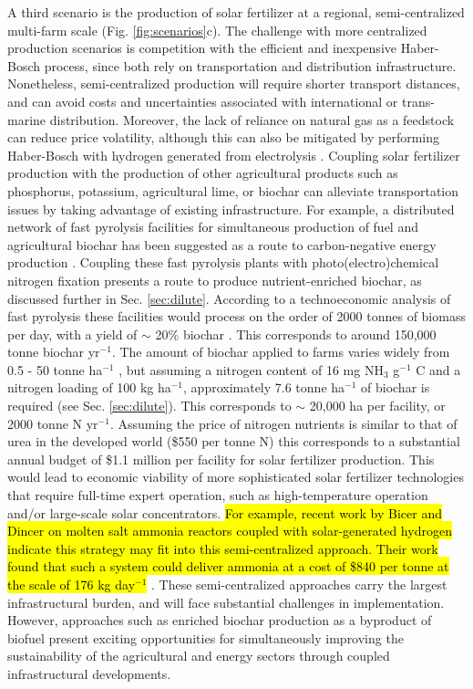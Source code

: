 A third scenario is the production of solar fertilizer at a regional, semi-centralized multi-farm scale (Fig. \ref{fig:scenarios}c). The challenge with more centralized production scenarios is competition with the efficient and inexpensive Haber-Bosch process, since both rely on transportation and distribution infrastructure. Nonetheless, semi-centralized production will require shorter transport distances, and can avoid costs and uncertainties associated with international or trans-marine distribution. Moreover, the lack of reliance on natural gas as a feedstock can reduce price volatility, although this can also be mitigated by performing Haber-Bosch with hydrogen generated from electrolysis \cite{Grundt_1982, Pfromm_2017}. Coupling solar fertilizer production with the production of other agricultural products such as phosphorus, potassium, agricultural lime, or biochar can alleviate transportation issues by taking advantage of existing infrastructure. For example, a distributed network of fast pyrolysis facilities for simultaneous production of fuel and agricultural biochar has been suggested as a route to carbon-negative energy production \cite{Lehmann2007,Lehmann_2007, Glaser2002}. Coupling these fast pyrolysis plants with photo(electro)chemical nitrogen fixation presents a route to produce nutrient-enriched biochar, as discussed further in Sec. \ref{sec:dilute}. According to a technoeconomic analysis of fast pyrolysis these facilities would process on the order of 2000 tonnes of biomass per day, with a yield of $\sim$ 20\% biochar  \cite{Wright_2010}. This corresponds to around 150,000 tonne biochar yr$^{-1}$. The amount of biochar applied to farms varies widely from 0.5 - 50 tonne ha$^{-1}$ \cite{Galinato2011}, but assuming a nitrogen content of 16 mg NH$_3$ g$^{-1}$ C and a nitrogen loading of 100 kg ha$^{-1}$, approximately 7.6 tonne ha$^{-1}$ of biochar is required (see Sec. \ref{sec:dilute}). This corresponds to $\sim$ 20,000 ha per facility, or 2000 tonne N yr$^{-1}$. Assuming the price of nitrogen nutrients is similar to that of urea in the developed world (\$550 per tonne N) this corresponds to a substantial annual budget of \$1.1 million per facility for solar fertilizer production. This would lead to economic viability of more sophisticated solar fertilizer technologies that require full-time expert operation, such as high-temperature operation and/or large-scale solar concentrators. \hl{For example, recent work by Bicer and Dincer on molten salt ammonia reactors coupled with solar-generated hydrogen indicate this strategy may fit into this semi-centralized approach. Their work found that such a system could deliver ammonia at a cost of \$840 per tonne at the scale of 176 kg day$^{-1}$} \cite{Bicer_2018,Bicer_2017}. These semi-centralized approaches carry the largest infrastructural burden, and will face substantial challenges in implementation. However, approaches such as enriched biochar production as a byproduct of biofuel present exciting opportunities for simultaneously improving the sustainability of the agricultural and energy sectors through coupled infrastructural developments.

